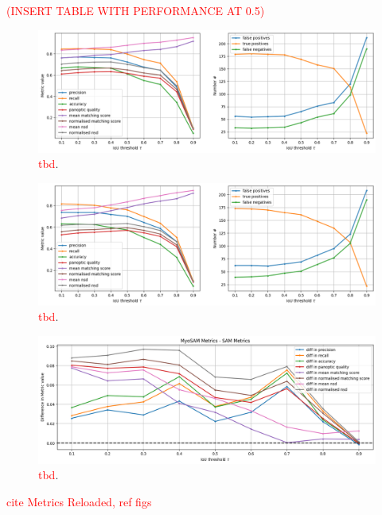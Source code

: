\textcolor{red}{(INSERT TABLE WITH PERFORMANCE AT 0.5)}
\begin{figure}
	\centering
	\includegraphics[width=\textwidth]{"images/quantitative_performance_myosam.png"}
	\caption[Quantitative performance \texttt{MyoSAM}]{\textcolor{red}{tbd}.}
	\label{figperfsam}
\end{figure}
\begin{figure}
	\centering
	\includegraphics[width=\textwidth]{"images/quantitative_performance_sam.png"}
	\caption[Quantitative performance \texttt{SAM}]{\textcolor{red}{tbd}.}
	\label{figperfsambase}
\end{figure}
\begin{figure}
	\centering
	\includegraphics[width=\textwidth]{"images/diff_quantitative_performance_myosam_sam.png"}
	\caption[Difference quantitative performance \texttt{SAM}\texttt{MyoSAM}]{\textcolor{red}{tbd}.}
	\label{figperfdiffsam}
\end{figure} 

\textcolor{red}{cite Metrics Reloaded, ref figs}

